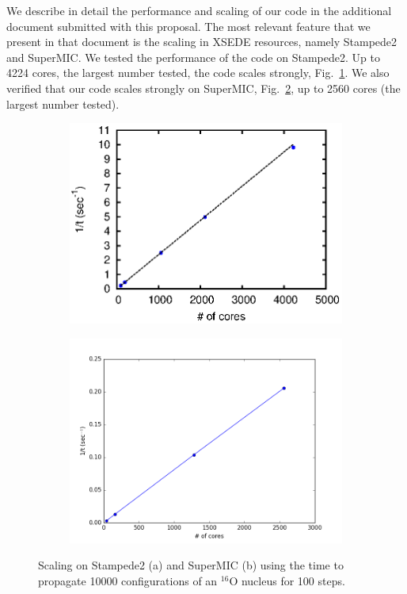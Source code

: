 \documentclass[12pt,letterpaper]{article}
\begin{document}
We describe in detail the 
performance and scaling of our code in the additional document submitted 
with this proposal. The most relevant feature that we present in that 
document is the scaling in XSEDE resources, namely Stampede2 and SuperMIC.
We tested the 
performance of the code on Stampede2. Up to 4224
cores, the 
largest number tested, the code scales strongly, Fig.~\ref{fig:stampede}.
We also verified that our code
scales strongly on SuperMIC, Fig.~\ref{fig:supermic}, up to 2560 cores (the 
largest number tested).

\begin{figure}[!htb]
\centering
\begin{subfigure}{.45\textwidth}
  \centering
  \includegraphics[width=\textwidth]{stampede.eps}
  \caption{}
  \label{fig:stampede}
\end{subfigure}%
\hspace{0.01\textwidth}
\begin{subfigure}{.45\textwidth}
  \centering
  \includegraphics[width=\textwidth]{supermic.png}
  \caption{}
  \label{fig:supermic}
\end{subfigure}
\caption{Scaling on Stampede2 (a) and SuperMIC (b) using the time to propagate 
10000 configurations of an $^{16}$O nucleus for 100 steps.}
\label{fig:scaling}
\end{figure}
\end{document}

